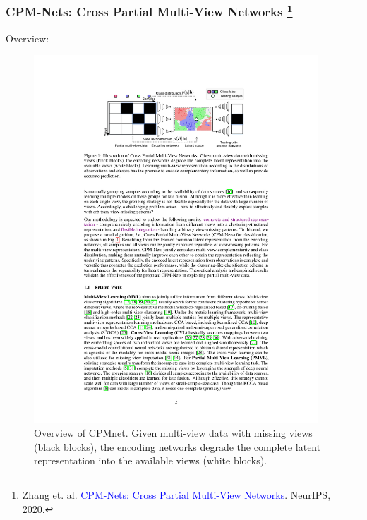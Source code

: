\documentclass[notheorems, aspectratio=54]{beamer}
\begin{document}
\begin{frame} \frametitle{CPM-Nets: Cross Partial Multi-View Networks \footnote{Zhang et. al. \textcolor{blue}{CPM-Nets: Cross Partial Multi-View Networks}. NeurIPS, 2020.}}

Overview:

\begin{figure}
\centering
\includegraphics[width=0.95\textwidth]{./fig/overview_cpmnet.pdf}
\caption{Overview of CPMnet.  Given multi-view data with missing views (black blocks), the encoding networks degrade the complete latent representation into the available views (white blocks).}
\label{fig:overview_lmsc}
\end{figure}


\end{frame}
\end{document}
